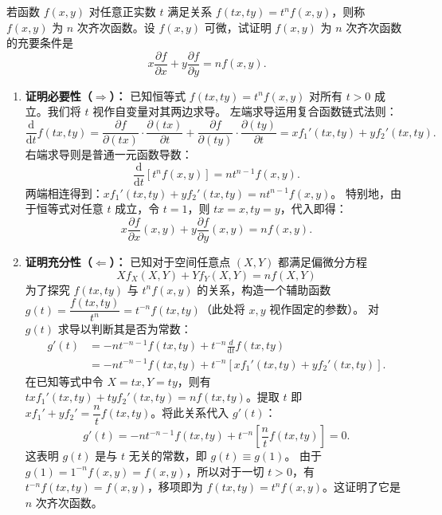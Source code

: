\documentclass[lang=cn,11pt]{elegantbook}
\begin{document}
\begin{exercise}[欧拉齐次函数定理]
若函数 $f(x,y)$ 对任意正实数 $t$ 满足关系 $f(tx,ty) = t^n f(x,y)$，则称 $f(x,y)$ 为 $n$ 次齐次函数。设 $f(x,y)$ 可微，试证明 $f(x,y)$ 为 $n$ 次齐次函数的充要条件是
\[
x\frac{\partial f}{\partial x} + y\frac{\partial f}{\partial y} = nf(x,y).
\]
\end{exercise}
\begin{solution}
\begin{enumerate}
  \item \textbf{证明必要性（$\Rightarrow$）：}
  已知恒等式 $f(tx, ty) = t^n f(x,y)$ 对所有 $t>0$ 成立。我们将 $t$ 视作自变量对其两边求导。
  左端求导运用复合函数链式法则：
  \[
  \frac{\mathrm d}{\mathrm{d}t} f(tx,ty) = \frac{\partial f}{\partial (tx)} \cdot \frac{\partial (tx)}{\partial t} + \frac{\partial f}{\partial (ty)} \cdot \frac{\partial (ty)}{\partial t} = x f_1'(tx,ty) + y f_2'(tx,ty).
  \]
  右端求导则是普通一元函数导数：
  \[
  \frac{\mathrm d}{\mathrm{d}t} [t^n f(x,y)] = n t^{n-1} f(x,y).
  \]
  两端相连得到：$x f_1'(tx,ty) + y f_2'(tx,ty) = n t^{n-1} f(x,y)$。
  特别地，由于恒等式对任意 $t$ 成立，令 $t=1$，则 $tx=x, ty=y$，代入即得：
  \[
  x \frac{\partial f}{\partial x}(x,y) + y \frac{\partial f}{\partial y}(x,y) = n f(x,y).
  \]

  \item \textbf{证明充分性（$\Leftarrow$）：}
  已知对于空间任意点 $(X, Y)$ 都满足偏微分方程 \[X f_X(X,Y) + Y f_Y(X,Y) = n f(X,Y)\]
  为了探究 $f(tx,ty)$ 与 $t^n f(x,y)$ 的关系，构造一个辅助函数 $g(t) = \dfrac{f(tx,ty)}{t^n} = t^{-n} f(tx,ty)$（此处将 $x, y$ 视作固定的参数）。
  对 $g(t)$ 求导以判断其是否为常数：
  \begin{align*}
  g'(t) &= -n t^{-n-1} f(tx,ty) + t^{-n} \frac{d}{\mathrm{d}t} f(tx,ty) \\
  &= -n t^{-n-1} f(tx,ty) + t^{-n} \left[ x f_1'(tx,ty) + y f_2'(tx,ty) \right].
  \end{align*}
  在已知等式中令 $X=tx, Y=ty$，则有 $tx f_1'(tx,ty) + ty f_2'(tx,ty) = n f(tx,ty)$。提取 $t$ 即 $x f_1' + y f_2' = \dfrac{n}{t} f(tx,ty)$。将此关系代入 $g'(t)$：
  \[
  g'(t) = -n t^{-n-1} f(tx,ty) + t^{-n} \left[ \frac{n}{t} f(tx,ty) \right] = 0.
  \]
  这表明 $g(t)$ 是与 $t$ 无关的常数，即 $g(t) \equiv g(1)$。
  由于 $g(1) = 1^{-n} f(x,y) = f(x,y)$，所以对于一切 $t>0$，有 $t^{-n}f(tx,ty) = f(x,y)$，移项即为 $f(tx,ty) = t^n f(x,y)$。这证明了它是 $n$ 次齐次函数。
\end{enumerate}
\end{solution}
\end{document}
